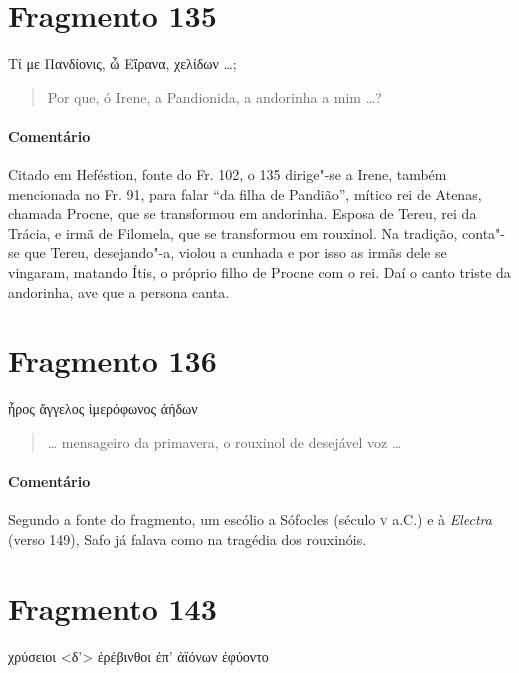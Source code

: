 {\pagebreak
\section{Fragmento 135}

\begin{gkverse}
Τί με Πανδίονις, ὦ Εἴρανα, χελίδων \ldots{};
\end{gkverse}

\begin{verse}
Por que, ó Irene, a Pandionida, a andorinha a mim \ldots{}?
\end{verse}

{\paragraph{Comentário} Citado em Heféstion, fonte do Fr. 102, o 135 dirige"-se a Irene, também mencionada no Fr. 91, para falar ``da filha de Pandião'', mítico rei de Atenas, chamada Procne, que se transformou em andorinha. Esposa de Tereu, rei da Trácia, e irmã de Filomela, que se transformou em rouxinol. Na tradição, conta"-se que Tereu, desejando"-a, violou a cunhada e por isso as irmãs dele se vingaram, matando Ítis, o próprio filho de Procne com o rei. Daí o canto triste da andorinha, ave que a persona canta.}


\section{Fragmento 136}

\begin{gkverse}
ἦρος ἄγγελος ἰμερόφωνος ἀήδων
\end{gkverse}

\begin{verse}
\ldots{} mensageiro da primavera, o rouxinol de desejável voz \ldots{}
\end{verse}

{\paragraph{Comentário} Segundo a fonte do fragmento, um escólio a Sófocles (século \textsc{v} a.C.) e à \textit{Electra} (verso 149), Safo já falava como na tragédia dos
rouxinóis.}

\section{Fragmento 143}

\begin{gkverse}
χρύσειοι <δ’> ἐρέβινθοι ἐπ’ ἀϊόνων ἐφύοντο
\end{gkverse}

}
